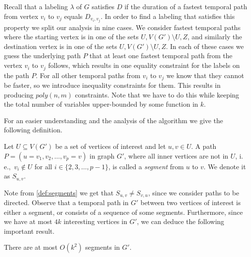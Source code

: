 \documentclass[a4paper,UKenglish,cleveref, autoref, thm-restate]{lipics-v2021}
\newcommand{\ie}{i.\,e.,\ }
\newcommand{\deltaExact}{\textsc{Periodic TGR}}
\begin{document}
Recall that a labeling $\lambda$ of $G$ satisfies $D$ if the duration of a fastest temporal path from vertex $v_i$ to $v_j$ equals $D_{v_i, v_j}$.
In order to find a labeling that satisfies this property we split our analysis in nine cases.
We consider fastest temporal paths 
where the starting vertex is in one of the sets $U,V(G') \setminus U, Z$,
and similarly the destination vertex is in one of the sets $U,V(G') \setminus U, Z$.
In each of these cases we guess the underlying path $P$ that at least one fastest temporal path from the vertex $v_i$ to $v_j$ follows, 
which results in one equality constraint for the labels on the path $P$. 
For all other temporal paths from $v_i$ to $v_j$ we know that they cannot be faster, so we introduce inequality constraints for them.
This results in producing $poly(n,m)$ constraints. 
Note that we have to do this while keeping the total number of variables upper-bounded by some function in $k$.

For an easier understanding and the analysis of the algorithm we give the following definition.
\begin{definition}\label{def:segments}
    Let $U \subseteq V(G')$ be a set of vertices of interest and let $u,v \in U$.
    A path $P = (u=v_1,v_2, \dots, v_p = v)$  in graph $G'$, where all inner vertices are not in $U$, \ie $v_i \notin U$ for all $i \in \{ 2, 3, \dots, p-1\}$,
    is called a \emph{segment} from $u$ to $v$. We denote it as $S_{u,v}$.
\end{definition}
Note from \cref{def:segments} we get that $S_{u,v} \neq S_{v,u}$, since we consider paths to be directed. Observe that a temporal path in $G'$ between two vertices of interest is either a segment, or consists of a sequence of some segments. Furthermore, since we have at most $4k$ interesting vertices in $G'$, we can deduce the following important result.
\begin{corollary}\label{obs:FPT-k2segments}
    There are at most $O(k^2)$ segments in $G'$.
\end{corollary}
\end{document}
